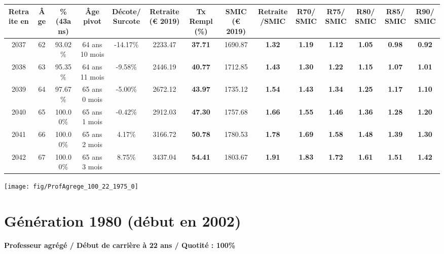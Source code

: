 \begin{adjustbox}{max width=\textwidth} 
\begin{tabular}[htb]{|c|c||c|c|c||c|c||c|c||c|c|c|c|c|} 
\hline 
 Retraite en &  Âge &  \%(43ans) &  Âge pivot &  Décote/Surcote &  Retraite (\euro{} 2019) &  Tx Rempl(\%) &  SMIC (\euro{} 2019) &  Retraite/SMIC &  R70/SMIC &  R75/SMIC &  R80/SMIC &  R85/SMIC &  R90/SMIC \\ 
\hline \hline 
 2037 &  62 &  93.02\% &  64 ans 10 mois &  -14.17\% &  2233.47 &  {\bf 37.71} &  1690.87 &  {\bf 1.32} &  {\bf 1.19} &  {\bf 1.12} &  {\bf 1.05} &  {\bf {\color{red} 0.98}} &  {\bf {\color{red} 0.92}} \\ 
\hline 
 2038 &  63 &  95.35\% &  64 ans 11 mois &  -9.58\% &  2446.19 &  {\bf 40.77} &  1712.85 &  {\bf 1.43} &  {\bf 1.30} &  {\bf 1.22} &  {\bf 1.15} &  {\bf 1.07} &  {\bf 1.01} \\ 
\hline 
 2039 &  64 &  97.67\% &  65 ans 0 mois &  -5.00\% &  2672.12 &  {\bf 43.97} &  1735.12 &  {\bf 1.54} &  {\bf 1.43} &  {\bf 1.34} &  {\bf 1.25} &  {\bf 1.17} &  {\bf 1.10} \\ 
\hline 
 2040 &  65 &  100.00\% &  65 ans 1 mois &  -0.42\% &  2912.03 &  {\bf 47.30} &  1757.68 &  {\bf 1.66} &  {\bf 1.55} &  {\bf 1.46} &  {\bf 1.36} &  {\bf 1.28} &  {\bf 1.20} \\ 
\hline 
 2041 &  66 &  100.00\% &  65 ans 2 mois &  4.17\% &  3166.72 &  {\bf 50.78} &  1780.53 &  {\bf 1.78} &  {\bf 1.69} &  {\bf 1.58} &  {\bf 1.48} &  {\bf 1.39} &  {\bf 1.30} \\ 
\hline 
 2042 &  67 &  100.00\% &  65 ans 3 mois &  8.75\% &  3437.04 &  {\bf 54.41} &  1803.67 &  {\bf 1.91} &  {\bf 1.83} &  {\bf 1.72} &  {\bf 1.61} &  {\bf 1.51} &  {\bf 1.42} \\ 
\hline 
\hline 
\end{tabular} 
\end{adjustbox} 
 
 \vspace{0.1cm} 

 {\hspace{-2.2cm}\texttt{[image: fig/ProfAgrege\_100\_22\_1975\_0]}} 

\newpage 
 
\section{Génération 1980 (début en 2002)\label{ProfAgrege_100_22_1980_0}} 
 
{\bf \noindent Professeur agrégé / Début de carrière à 22 ans / Quotité : 100\%}  ~ 

